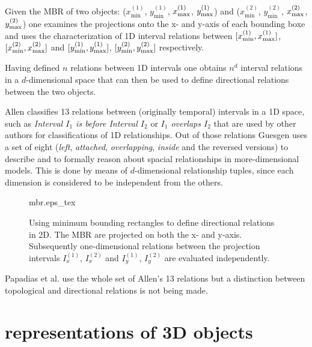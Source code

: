 \documentclass[paper=a4, fontsize=11pt]{scrartcl} %
\numberwithin{equation}{section} %
\numberwithin{figure}{section} %
\numberwithin{table}{section} %
\begin{document}
Given the MBR of two objects: ($x^{(1)}_{\mathrm{min}}$, $y^{(1)}_{\mathrm{min}}$, $x^{(1)}_{\vphantom{\mathrm{i}}\mathrm{max}}$, $y^{(1)}_{\vphantom{\mathrm{i}}\mathrm{max}}$) and ($x^{(2)}_{\mathrm{min}}$, $y^{(2)}_{\mathrm{min}}$, $x^{(2)}_{\vphantom{\mathrm{i}}\mathrm{max}}$, $y^{(2)}_{\vphantom{\mathrm{i}}\mathrm{max}}$) one examines the projections onto the x- and y-axis of each bounding boxe and uses the characterization of 1D interval relations between $[x^{(1)}_{\mathrm{min}}, x^{(1)}_{\vphantom{\mathrm{i}}\mathrm{max}}]$, $[x^{(2)}_{\mathrm{min}}, x^{(2)}_{\vphantom{\mathrm{i}}\mathrm{max}}]$ and $[y^{(1)}_{\mathrm{min}}, y^{(1)}_{\vphantom{\mathrm{i}}\mathrm{max}}]$, $[y^{(2)}_{\mathrm{min}}, y^{(2)}_{\vphantom{\mathrm{i}}\mathrm{max}}]$ respectively. 
 
Having defined $n$ relations between 1D intervals one obtains $n^d$ interval relations in a $d$-dimensional space that can then be used to define directional relations between the two objects. 

Allen \cite{Allen:1983:MKT:182.358434} classifies 13 relations between (originally temporal) intervals in a 1D space, such as \textit{Interval $I_1$ is before Interval $I_2$} or \textit{$I_1$ overlaps $I_2$} that are used by other authors for classifications of 1D relationships. Out of those relations Guesgen \cite{guesgen1989spatial} uses a set of eight (\emph{left}, \emph{attached}, \emph{overlapping}, \emph{inside} and the reversed versions) to describe and to formally reason about spacial relationships in more-dimensional models. This is done by means of $d$-dimensional relationship tuples, since each dimension is considered to be independent from the others.

\begin{figure}
  \centering
  \def\svgwidth{20em}
  {mbr.eps_tex}
  \caption{Using minimum bounding rectangles to define directional relations in 2D. The MBR are projected on both the x- and y-axis. Subsequently one-dimensional relations between the projection intervals $I^{(1)}_x$, $I^{(2)}_x$  and $I^{(1)}_y$, $I^{(2)}_y$ are evaluated independently.}
\label{fig:mbr}
\end{figure}

Papadias et al. \cite{papadias1995topological} use the whole set of Allen's 13 relations but a distinction between topological and directional relations is not being made. 


\section{representations of 3D objects}
\end{document}
